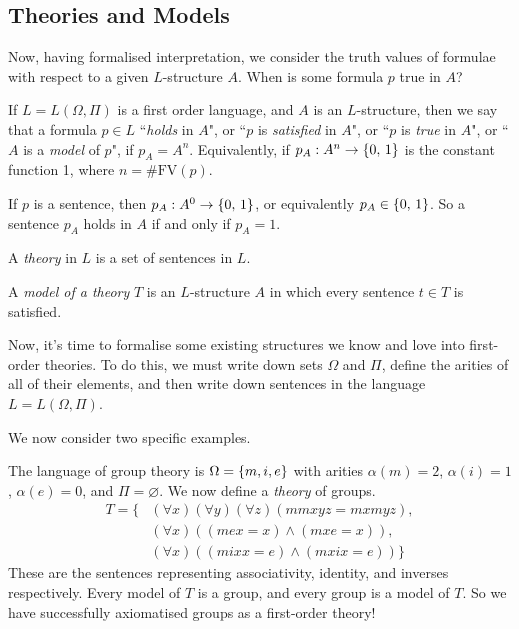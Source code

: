 \documentclass{article}
\begin{document}

\subsection{Theories and Models}

Now, having formalised interpretation, we consider the truth values of formulae with respect to a given $L$-structure $A$. When is some formula $p$ true in $A$?

\begin{definition}[Model]
	\label{first-order-predicate-model}
    If $L = L(\Omega, \Pi)$ is a first order language, and $A$ is an $L$-structure, then we say that a formula $p \in L$ ``\textit{holds} in $A$", or ``$p$ is \textit{satisfied} in $A$", or ``$p$ is \textit{true} in $A$", or ``$A$ is a \textit{model} of $p$", if $p_A = A^n$. Equivalently, if $p_A : A^n \to \left\lbrace 0, \, 1 \right\rbrace$ is the constant function 1, where $n = \# \mathrm{FV}(p)$.
\end{definition}

\begin{corollary}
	If $p$ is a sentence, then $p_A : A^0 \to \left\lbrace 0, \, 1 \right\rbrace$, or equivalently $p_A \in \left\lbrace 0, \, 1 \right\rbrace$. So a sentence $p_A$ holds in $A$ if and only if $p_A = 1$.
\end{corollary}

\begin{definition}[Theory]
    A \textit{theory} in $L$ is a set of sentences in $L$.
    
    A \textit{model of a theory} $T$ is an $L$-structure $A$ in which every sentence $t \in T$ is satisfied.
\end{definition}

Now, it's time to formalise some existing structures we know and love into first-order theories. To do this, we must write down sets $\Omega$ and $\Pi$, define the arities of all of their elements, and then write down sentences in the language $L = L(\Omega, \Pi)$.

We now consider two specific examples.

\begin{example}
    The language of group theory is $\Omega = \left\lbrace m, i, e \right\rbrace$ with arities $\alpha(m) = 2$, $\alpha(i) = 1$, $\alpha(e) = 0$, and $\Pi = \varnothing$. We now define  a \textit{theory} of groups.
    \begin{align*}
    	T = \{ &(\forall x)(\forall y)(\forall z)(mmxyz = mxmyz), \\
    	&(\forall x)((mex = x) \land (mxe = x)), \\
    	&(\forall x)((mixx = e) \land (mxix = e)) \}
	\end{align*}
	These are the sentences representing associativity, identity, and inverses respectively. Every model of $T$ is a group, and every group is a model of $T$. So we have successfully axiomatised groups as a first-order theory!
\end{example}
\end{document}
